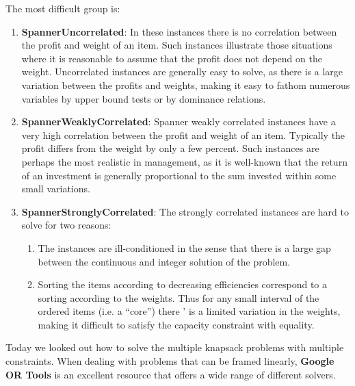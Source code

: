 \documentclass{article}
\begin{document}
The most difficult group is:
\begin{enumerate}
 	\item \textbf{SpannerUncorrelated}: In these instances there is no correlation between the profit and weight of an item. Such instances illustrate those situations where it is reasonable to assume that the profit does not depend on the weight. Uncorrelated instances are generally easy to solve, as there is a large variation between the profits and weights, making it easy to fathom numerous variables by upper bound tests or by dominance relations.
 	\item \textbf{SpannerWeaklyCorrelated}: Spanner weakly correlated instances have a very high correlation between the profit and weight of an item. Typically the profit differs from the weight by only a few percent. Such instances are perhaps the most realistic in management, as it is well-known that the return of an investment is generally proportional to the sum invested within some small variations.
 	\item \textbf{SpannerStronglyCorrelated}: The strongly correlated instances are hard to solve for two reasons:
 	\begin{enumerate}
		\item  The instances are ill-conditioned in the sense that there is a large gap between the continuous and integer solution of the problem.
		\item  Sorting the items according to decreasing efficiencies correspond to a sorting according to the weights. Thus for any small interval of the ordered items (i.e. a “core”) there ’ is a limited variation in the weights, making it difficult to satisfy the capacity constraint with equality.
	\end{enumerate}
\end{enumerate}
Today we looked out how to solve the multiple knapsack problems with multiple constraints. When dealing with problems that can be framed linearly, \textbf{Google OR Tools} is an excellent resource that offers a wide range of different solvers.
\end{document}
